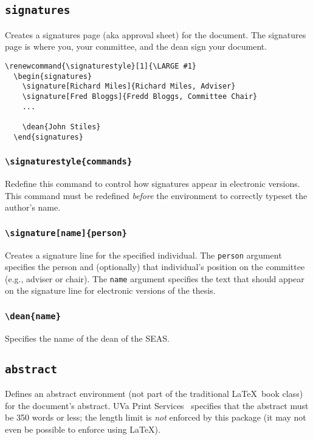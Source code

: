 \documentclass[10pt]{article}
\newcommand{\environment}[1]{\texttt{#1}}
\newcommand{\command}[1]{\texttt{\textbackslash#1}}
\newcommand{\argument}[1]{\texttt{#1}}
\begin{document}
\subsection{\environment{signatures}}
Creates a signatures page (aka approval sheet) for the document.
The signatures page is where you, your committee, and the dean sign your document.

\begin{lstlisting}[gobble=2,float=h]
  \renewcommand{\signaturestyle}[1]{\LARGE #1}
  \begin{signatures}
    \signature[Richard Miles]{Richard Miles, Adviser}
    \signature[Fred Bloggs]{Fredd Bloggs, Committee Chair}
    ...
    
    \dean{John Stiles}
  \end{signatures}
\end{lstlisting}

\subsubsection{\command{signaturestyle\{commands\}}}
Redefine this command to control how signatures appear in electronic versions.
This command must be redefined \emph{before} the environment to correctly typeset the author's name.

\subsubsection{\command{signature[name]\{person\}}}
Creates a signature line for the specified individual.
The \argument{person} argument specifies the person and (optionally) that individual's position on the committee (e.g., adviser or chair).
The \argument{name} argument specifies the text that should appear on the signature line for electronic versions of the thesis.

\subsubsection{\command{dean\{name\}}}
Specifies the name of the dean of the \gls{SEAS}.

\subsection{\environment{abstract}}
Defines an abstract environment (not part of the traditional \LaTeX\ book class) for the document's abstract.
\Gls{UVa} Print Services~\cite{uvaprint:thesis} specifies that the abstract must be 350 words or less;
the length limit is \emph{not} enforced by this package (it may not even be possible to enforce using \LaTeX).
\end{document}
